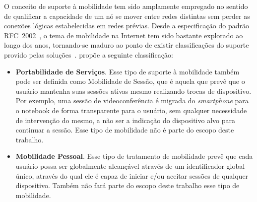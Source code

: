 \documentclass[	12pt, Times, openright, twoside, a4paper, english, brazil]{abntex2}
\begin{document}
O conceito de suporte à mobilidade tem sido amplamente empregado no sentido de qualificar a capacidade de um nó se mover entre redes distintas sem perder as conexões lógicas estabelecidas em redes prévias. Desde a especificação do padrão RFC~2002~\cite{perkins1996}, o tema de mobilidade na Internet tem sido bastante explorado ao longo dos anos, tornando-se maduro ao ponto de existir classificações do suporte provido pelas soluções~\cite{pandya2004}.  propõe a seguinte classificação:
\begin{itemize}
    \item \textbf{Portabilidade de Serviços}. Esse tipo de suporte à mobilidade também pode ser definida como Mobilidade de Sessão, que é aquela que prevê que o usuário mantenha suas sessões ativas mesmo realizando trocas de dispositivo. Por exemplo, uma sessão de videoconferência é migrada do \textit{smartphone} para o notebook de forma transparente para o usuário, sem qualquer necessidade de intervenção do mesmo, a não ser a indicação do dispositivo alvo para continuar a sessão. Esse tipo de mobilidade não é parte do escopo deste trabalho.
    

    \item \textbf{Mobilidade Pessoal}. Esse tipo de tratamento de mobilidade prevê que cada usuário possa ser globalmente alcançável através de um identificador global único, através do qual ele é capaz de iniciar e/ou aceitar sessões de qualquer dispositivo. Também não fará parte do escopo deste trabalho esse tipo de mobilidade. 
    

\end{itemize}
\end{document}
